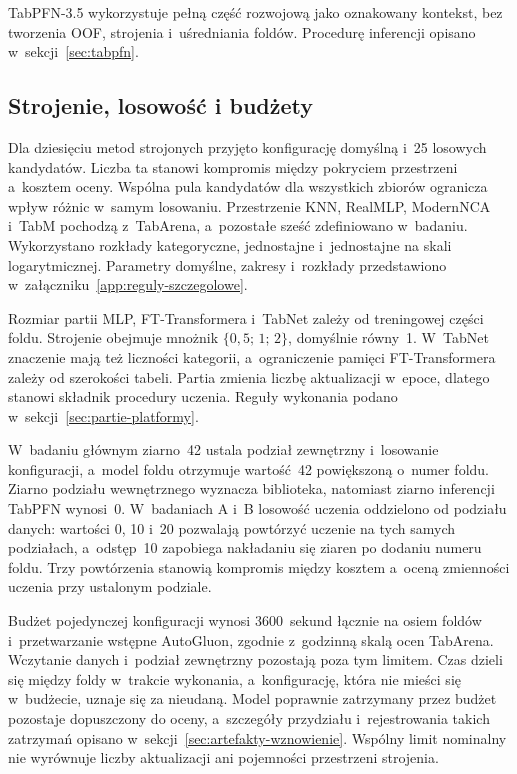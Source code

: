 TabPFN-3.5 wykorzystuje pełną część rozwojową jako oznakowany kontekst, bez tworzenia OOF, strojenia i~uśredniania foldów. Procedurę inferencji opisano w~sekcji~\ref{sec:tabpfn}.

\subsection{Strojenie, losowość i budżety}
\label{sec:strojenie}

Dla dziesięciu metod strojonych przyjęto konfigurację domyślną i~25 losowych kandydatów. Liczba ta stanowi kompromis między pokryciem przestrzeni a~kosztem oceny. Wspólna pula kandydatów dla wszystkich zbiorów ogranicza wpływ różnic w~samym losowaniu. Przestrzenie KNN, RealMLP, ModernNCA i~TabM pochodzą z~TabArena, a~pozostałe sześć zdefiniowano w~badaniu. Wykorzystano rozkłady kategoryczne, jednostajne i~jednostajne na skali logarytmicznej. Parametry domyślne, zakresy i~rozkłady przedstawiono w~załączniku~\ref{app:reguly-szczegolowe}.

Rozmiar partii MLP, FT-Transformera i~TabNet zależy od treningowej części foldu. Strojenie obejmuje mnożnik $\{0{,}5;\,1;\,2\}$, domyślnie równy~1. W~TabNet znaczenie mają też liczności kategorii, a~ograniczenie pamięci FT-Transformera zależy od szerokości tabeli. Partia zmienia liczbę aktualizacji w~epoce, dlatego stanowi składnik procedury uczenia. Reguły wykonania podano w~sekcji~\ref{sec:partie-platformy}.

W~badaniu głównym ziarno~42 ustala podział zewnętrzny i~losowanie konfiguracji, a~model foldu otrzymuje wartość~42 powiększoną o~numer foldu. Ziarno podziału wewnętrznego wyznacza biblioteka, natomiast ziarno inferencji TabPFN wynosi~0. W~badaniach A i~B losowość uczenia oddzielono od podziału danych: wartości 0, 10 i~20 pozwalają powtórzyć uczenie na tych samych podziałach, a~odstęp~10 zapobiega nakładaniu się ziaren po dodaniu numeru foldu. Trzy powtórzenia stanowią kompromis między kosztem a~oceną zmienności uczenia przy ustalonym podziale.

Budżet pojedynczej konfiguracji wynosi 3600~sekund łącznie na osiem foldów i~przetwarzanie wstępne AutoGluon, zgodnie z~godzinną skalą ocen TabArena. Wczytanie danych i~podział zewnętrzny pozostają poza tym limitem. Czas dzieli się między foldy w~trakcie wykonania, a~konfigurację, która nie mieści się w~budżecie, uznaje się za nieudaną. Model poprawnie zatrzymany przez budżet pozostaje dopuszczony do oceny, a~szczegóły przydziału i~rejestrowania takich zatrzymań opisano w~sekcji~\ref{sec:artefakty-wznowienie}. Wspólny limit nominalny nie wyrównuje liczby aktualizacji ani pojemności przestrzeni strojenia.

